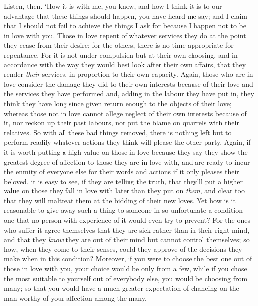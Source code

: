 Listen, then.
\blank[line]
‘How it is with me, you know, and how I think it is to our advantage
that these things should
happen, you have heard me say; and I claim that I should not fail to
achieve the things I ask for because I happen not to be in
love with you. Those in love repent of whatever services they do at the
point they cease from their desire; for the others, there is no time
appropriate for repentance. For it is not under compulsion but at their
own  choosing, and in accordance with the way they would best
look after their own affairs, that they render {\em their} services, in
proportion to their own
capacity. Again, those
who are in love consider the damage they did to their own interests
because of their love and the services they have performed and, adding
in the labour they have put in, they think they have long since 
given return enough to the objects of their love; whereas those not in
love cannot allege neglect of their own interests because of it, nor
reckon up their past labours, nor put the blame on quarrels with their
relatives. So with all these bad things  removed, there is
nothing left but to perform readily whatever actions they think will
please the other party.
Again, if it is  worth putting a high value on those in love
because they say they show the greatest degree of affection to those
they are in love with, and are ready to incur the enmity of everyone
else for their words and
actions if it only pleases their beloved, it  is easy to see, if
they are telling the truth, that they'll put a higher value on those
they fall in love with later than they put on {\em them}, and clear too
that they will maltreat them at the bidding of their new loves. Yet how
is it reasonable to give  away such a
thing to someone in so
unfortunate a condition -- one that no person with experience of it
would even try to prevent? For the ones who suffer it agree themselves
that they are sick rather than in their right mind, and that they
{\em know} they are out of their mind but cannot control themselves; so
 how, when they come to their senses, could they approve of the
decisions they make when in this condition? Moreover, if you were to
choose the best one out of those in love with you, your choice would be
only from a few, while if you chose the most suitable to yourself out of
everybody else, you would be choosing  from many; so that you
would have a much greater expectation of chancing on the man worthy of
your affection among the
many.

